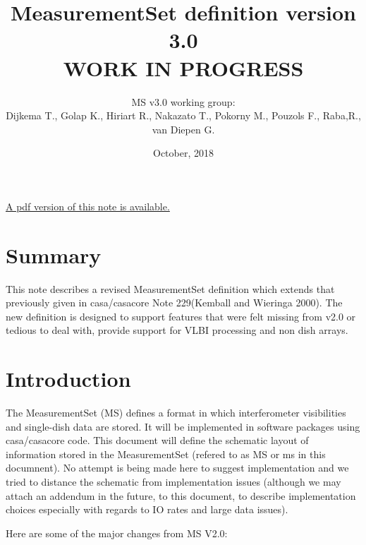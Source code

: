 \documentclass{article}
\begin{document}
\title{MeasurementSet definition version 3.0\\WORK IN PROGRESS}

\author{ MS v3.0 working group:\\
  Dijkema T., Golap K., Hiriart R., Nakazato T., Pokorny M., Pouzols F., Raba,R., van Diepen G.
}
\date{October, 2018}
\maketitle

\ifpdf
\else
\href{264.pdf}{A pdf version of this note is available.}
\fi

\tableofcontents 
\section{Summary} 

This note describes a revised MeasurementSet definition which extends
that previously given in casa/casacore Note 229(Kemball and Wieringa
2000).  The new definition is designed to support features that were
felt missing from v2.0 or tedious to deal with, provide support for
VLBI processing and non dish arrays.

\section{Introduction}

The MeasurementSet (MS) defines a format in which interferometer
visibilities and single-dish data are stored. It will be implemented in
software packages using casa/casacore code.  This document will define
the schematic layout of information stored in the MeasurementSet
(refered to as MS or ms in this documnent).  No attempt is being made
here to suggest implementation and we tried to distance the schematic
from implementation issues (although we may attach an addendum in the
future, to this document, to describe implementation choices
especially with regards to IO rates and large data issues).

Here are some of the major changes from MS V2.0:
\end{document}
